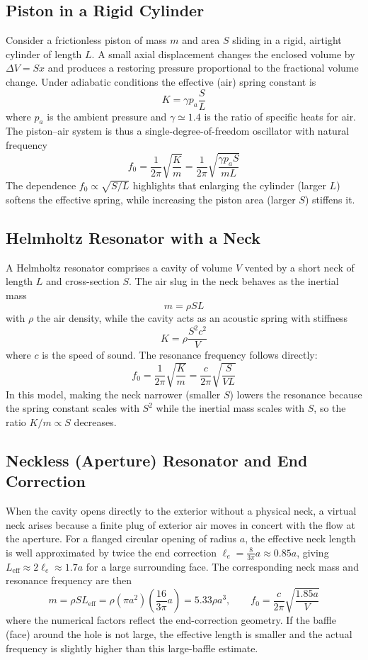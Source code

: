 \subsection{Piston in a Rigid Cylinder}

Consider a frictionless piston of mass \( m \) and area \( S \) sliding in a rigid, airtight cylinder of length \( L \). A small axial displacement changes the enclosed volume by \( \Delta V = Sx \) and produces a restoring pressure proportional to the fractional volume change. Under adiabatic conditions the effective (air) spring constant is
\[
K = \gamma p_a\frac{S}{L}
\]
where \( p_a \) is the ambient pressure and \( \gamma\simeq 1.4 \) is the ratio of specific heats for air. The piston–air system is thus a single-degree-of-freedom oscillator with natural frequency
\[
f_0 = \frac{1}{2\pi}\sqrt{\frac{K}{m}}
 = \frac{1}{2\pi}\sqrt{\frac{\gamma p_aS}{mL}}
\]
The dependence \( f_0\propto \sqrt{S/L} \) highlights that enlarging the cylinder (larger \( L \)) softens the effective spring, while increasing the piston area (larger \( S \)) stiffens it.

\subsection{Helmholtz Resonator with a Neck}

A Helmholtz resonator comprises a cavity of volume \( V \) vented by a short neck of length \( L \) and cross-section \( S \). The air slug in the neck behaves as the inertial mass
\[
m = \rho SL
\]
with \( \rho \) the air density, while the cavity acts as an acoustic spring with stiffness
\[
K = \rho\frac{S^{2}c^{2}}{V}
\]
where \( c \) is the speed of sound. The resonance frequency follows directly:
\[
f_0 = \frac{1}{2\pi}\sqrt{\frac{K}{m}}
 = \frac{c}{2\pi}\sqrt{\frac{S}{VL}}
\]
In this model, making the neck narrower (smaller \( S \)) lowers the resonance because the spring constant scales with \( S^2 \) while the inertial mass scales with \( S \), so the ratio \( K/m\propto S \) decreases.

\subsection{Neckless (Aperture) Resonator and End Correction}

When the cavity opens directly to the exterior without a physical neck, a virtual neck arises because a finite plug of exterior air moves in concert with the flow at the aperture. For a flanged circular opening of radius \( a \), the effective neck length is well approximated by twice the end correction \( \ell_e = \tfrac{8}{3\pi}a\approx 0.85a \), giving \( L_{\mathrm{eff}}\approx 2\ell_e\approx 1.7a \) for a large surrounding face. The corresponding neck mass and resonance frequency are then
\[
m = \rho SL_{\mathrm{eff}}
 = \rho(\pi a^{2})\left(\frac{16}{3\pi}a\right)
 = 5.33\rho a^{3},
\qquad
f_0 = \frac{c}{2\pi}\sqrt{\frac{1.85a}{V}}
\]
where the numerical factors reflect the end-correction geometry. If the baffle (face) around the hole is not large, the effective length is smaller and the actual frequency is slightly higher than this large-baffle estimate. 

